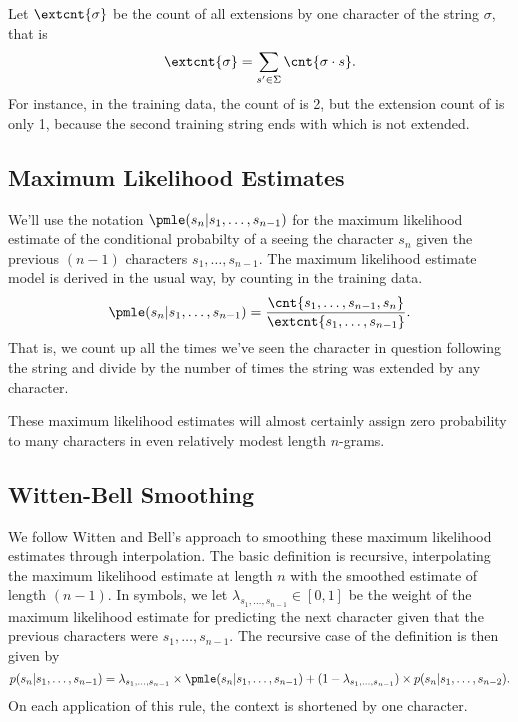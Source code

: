 Let $\extcnt{\sigma}$ be the count of all extensions by one character
of the string $\sigma$, that is
%
\begin{equation}
\extcnt{\sigma} = \sum_{s' \in \Sigma} \cnt{\sigma \cdot s}.
\end{equation}
%
For instance, in the training data, the count of  is
2, but the extension count of  is only 1, because
the second training string ends with  which is not
extended.


\subsection{Maximum Likelihood Estimates}

We'll use the notation $\pmle(s_n|s_1,\ldots,s_{n-1})$ for
the maximum likelihood estimate of the conditional probabilty of a
seeing the character $s_n$ given the previous $(n-1)$ characters
$s_1,\ldots,s_{n-1}$.  The maximum likelihood estimate model is
derived in the usual way, by counting in the training data.
%
\begin{equation}
\pmle(s_n|s_1,\ldots,s_{n-1})
= \frac{\cnt{s_1,\ldots,s_{n-1},s_{n}}}
       {\extcnt{s_1,\ldots,s_{n-1}}}.
\end{equation}
%
That is, we count up all the times we've seen the character in
question following the string and divide by the number of times
the string was extended by any character.

These maximum likelihood estimates will almost certainly assign zero
probability to many characters in even relatively modest length
$n$-grams. 

\subsection{Witten-Bell Smoothing}

We follow Witten and Bell's approach to smoothing these maximum
likelihood estimates through interpolation.  The basic definition is
recursive, interpolating the maximum likelihood estimate at length $n$
with the smoothed estimate of length $(n-1)$.  In symbols, we let
$\lambda_{s_1,\ldots,s_{n-1}} \in [0,1]$ be the weight of the maximum
likelihood estimate for predicting the next character given that the
previous characters were $s_1,\ldots,s_{n-1}$.  The recursive case
of the definition is then given by
%
\begin{equation}
p(s_n|s_1,\ldots,s_{n-1})
= \lambda_{s_1,\ldots,s_{n-1}} \times \pmle(s_n|s_1,\ldots,s_{n-1})
+
(1 - \lambda_{s_1,\ldots,s_{n-1}}) \times p(s_n|s_1,\ldots,s_{n-2}).
\end{equation}
%
On each application of this rule, the context is shortened by one
character.

